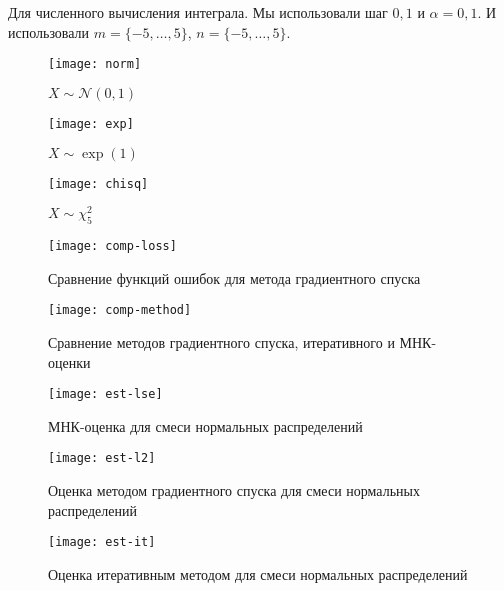 \documentclass[../paper.tex]{subfiles}
\begin{document}
\bigskip

Для численного вычисления интеграла. Мы использовали шаг $0{,}1$ и $\alpha = 0{,}1$. И использовали $m=\{-5, \dots, 5\}$, $n=\{-5, \dots, 5\}$.

\begin{figure}[h]
	\begin{minipage}{0.48\textwidth}
		\centering
		\texttt{[image: norm]}
		\caption{$X \sim \mathcal{N}(0, 1)$}
	\end{minipage}\hfill
	\begin{minipage}{0.48\textwidth}
		\centering
		\texttt{[image: exp]}
		\caption{$X \sim \exp(1)$}
	\end{minipage}\hfill
\end{figure}

\begin{figure}[h]
	\begin{minipage}{0.48\textwidth}
		\centering
		\texttt{[image: chisq]}
		\caption{$X \sim \chi^2_5$}
	\end{minipage}\hfill
	\begin{minipage}{0.48\textwidth}
		\centering
		\texttt{[image: comp-loss]}
		\caption{Сравнение функций ошибок для метода градиентного спуска}
	\end{minipage}\hfill
\end{figure}

\begin{figure}[h]
	\begin{minipage}{0.48\textwidth}
		\centering
		\texttt{[image: comp-method]}
		\caption{Сравнение методов градиентного спуска, итеративного и МНК-оценки}
	\end{minipage}\hfill
	\begin{minipage}{0.48\textwidth}
		\centering
		\texttt{[image: est-lse]}
		\caption{МНК-оценка для смеси нормальных распределений}
	\end{minipage}\hfill
\end{figure}

\begin{figure}[h]
	\begin{minipage}{0.48\textwidth}
		\centering
		\texttt{[image: est-l2]}
		\caption{Оценка методом градиентного спуска для смеси нормальных распределений}
	\end{minipage}\hfill
	\begin{minipage}{0.48\textwidth}
		\centering
		\texttt{[image: est-it]}
		\caption{Оценка итеративным методом для смеси нормальных распределений}
	\end{minipage}\hfill
\end{figure}
\end{document}
